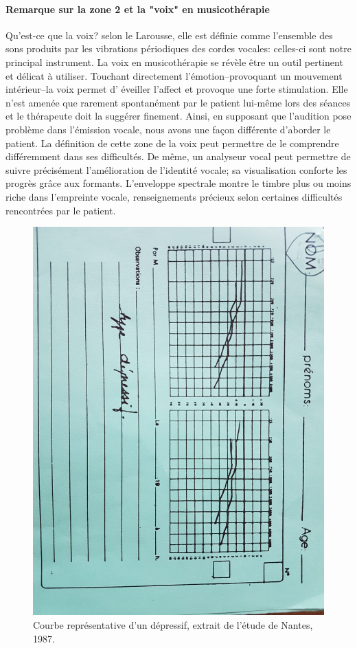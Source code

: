  \paragraph{Remarque sur la zone 2 et la "voix" en musicothérapie}
Qu'est-ce que la voix? selon le Larousse, elle est définie comme
l'ensemble des sons produits par les vibrations périodiques des
cordes vocales: celles-ci sont notre principal instrument.
La voix en musicothérapie se révèle être un outil pertinent et délicat
à utiliser. Touchant 
directement 
l'émotion--provoquant un mouvement intérieur--la voix permet d'
éveiller l'affect
et provoque une forte stimulation. Elle n'est amenée que rarement
spontanément par le patient lui-même lors des séances et le thérapeute doit la suggérer
finement.
Ainsi, en supposant que l'audition pose problème dans l'émission
vocale, nous avons une façon différente d'aborder le patient. La
définition de cette
zone de la voix peut permettre de le comprendre différemment dans ses difficultés. 
De même, un analyseur vocal peut permettre de suivre précisément l'amélioration de
l'identité vocale; sa visualisation conforte les progrès grâce aux
formants. L'enveloppe spectrale montre le timbre plus ou moins riche
dans l'empreinte vocale, renseignements précieux selon certaines
difficultés rencontrées par le patient.
  \begin{figure}
	\centering
	\includegraphics[width=0.7\linewidth]{images/courbedepressif.jpg}
	\caption[Exemple d'une courbe de dépressif]{Courbe
          représentative d'un dépressif, extrait de l'étude de Nantes,
         1987.}
       
	\label{groupecontroleimage1}
\end{figure}


